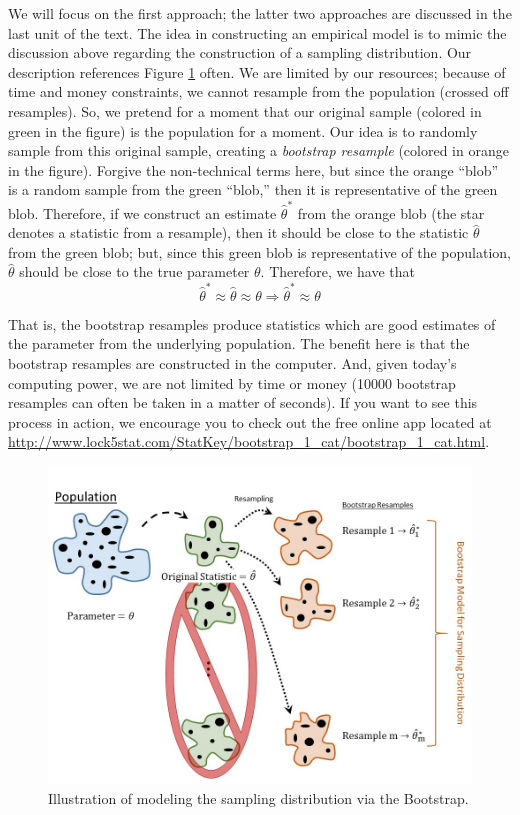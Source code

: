 \documentclass[]{book}
\theoremstyle{definition}
\theoremstyle{definition}
\theoremstyle{remark}
\begin{document}
We will focus on the first approach; the latter two approaches are
discussed in the last unit of the text. The idea in constructing an
empirical model is to mimic the discussion above regarding the
construction of a sampling distribution. Our description references
Figure \ref{fig:samplingdistns-bootstrap} often. We are limited by our
resources; because of time and money constraints, we cannot resample
from the population (crossed off resamples). So, we pretend for a moment
that our original sample (colored in green in the figure) is the
population for a moment. Our idea is to randomly sample from this
original sample, creating a \emph{bootstrap resample} (colored in orange
in the figure). Forgive the non-technical terms here, but since the
orange ``blob'' is a random sample from the green ``blob,'' then it is
representative of the green blob. Therefore, if we construct an estimate
\(\widehat{\theta}^*\) from the orange blob (the star denotes a
statistic from a resample), then it should be close to the statistic
\(\widehat{\theta}\) from the green blob; but, since this green blob is
representative of the population, \(\widehat{\theta}\) should be close
to the true parameter \(\theta\). Therefore, we have that \[
\widehat{\theta}^* \approx \widehat{\theta} \approx \theta \Rightarrow \widehat{\theta}^* \approx \theta
\]

That is, the bootstrap resamples produce statistics which are good
estimates of the parameter from the underlying population. The benefit
here is that the bootstrap resamples are constructed in the computer.
And, given today's computing power, we are not limited by time or money
(10000 bootstrap resamples can often be taken in a matter of seconds).
If you want to see this process in action, we encourage you to check out
the free online app located at
\url{http://www.lock5stat.com/StatKey/bootstrap_1_cat/bootstrap_1_cat.html}.

\begin{figure}

{\centering \includegraphics[width=0.8\linewidth]{./images/SamplingDistns-Bootstrap} 

}

\caption{Illustration of modeling the sampling distribution via the Bootstrap.}\label{fig:samplingdistns-bootstrap}
\end{figure}
\end{document}
